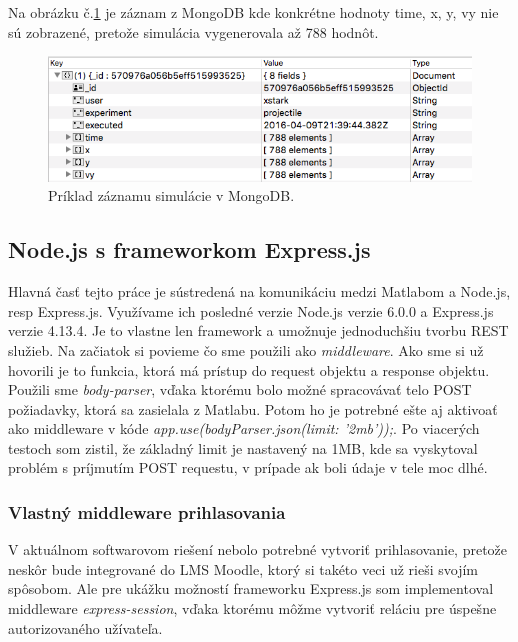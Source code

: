 Na obrázku č.\ref{img-mongo-record} je záznam z MongoDB kde konkrétne hodnoty time, x, y, vy nie sú zobrazené, pretože simulácia vygenerovala až 788 hodnôt.

\begin{figure}[H]
  \centering
  \includegraphics[scale=0.7]{img/code/mongodb-record.png}
  \caption{Príklad záznamu simulácie v MongoDB.}
  \label{img-mongo-record}
\end{figure}


\subsection{Node.js s frameworkom Express.js}
Hlavná časť tejto práce je sústredená na komunikáciu medzi Matlabom a Node.js, resp Express.js. Využívame ich posledné verzie Node.js verzie 6.0.0 a Express.js verzie 4.13.4. Je to vlastne len framework a umožnuje jednoduchšiu tvorbu REST služieb. Na začiatok si povieme čo sme použili ako \textit{middleware}. Ako sme si už hovorili je to funkcia, ktorá má prístup do request objektu a response objektu. Použili sme \textit{body-parser}, vďaka ktorému bolo možné spracovávať telo POST požiadavky, ktorá sa zasielala z Matlabu. Potom ho je potrebné ešte aj aktivoať ako middleware v kóde \textit{app.use(bodyParser.json({limit: '2mb'}));}. Po viacerých testoch som zistil, že základný limit je nastavený na 1MB, kde sa vyskytoval problém s príjmutím POST requestu, v prípade ak boli údaje v tele moc dlhé.

\subsubsection{Vlastný middleware prihlasovania}
V aktuálnom softwarovom riešení nebolo potrebné vytvoriť prihlasovanie, pretože neskôr bude integrované do LMS Moodle, ktorý si takéto veci už rieši svojím spôsobom. Ale pre ukážku možností frameworku Express.js som implementoval middleware \textit{express-session}, vďaka ktorému môžme vytvoriť reláciu pre úspešne autorizovaného užívateľa. 


